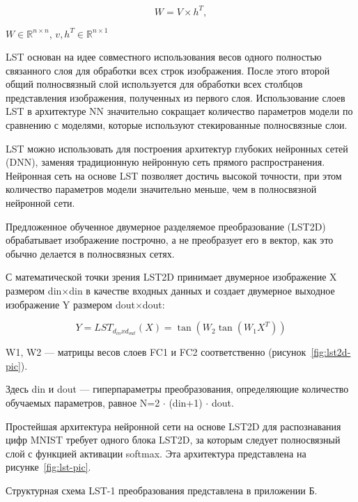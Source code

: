 \begin{equation}
    W = V \times h^T,
\end{equation}

 \(W\in \mathbb{R}^{n\times n}\), \(v, h^T\in \mathbb{R}^{n\times 1}\)

LST основан на идее совместного использования весов одного полностью связанного 
слоя для обработки всех строк изображения. После этого второй общий 
полносвязный слой используется для обработки всех столбцов представления 
изображения, полученных из первого слоя. Использование слоев LST в архитектуре 
NN значительно сокращает количество параметров модели по сравнению с моделями, 
которые используют стекированные полносвязные слои.

LST можно использовать для построения архитектур глубоких нейронных сетей 
(DNN), заменяя традиционную нейронную сеть прямого распространения. Нейронная 
сеть на основе LST позволяет достичь высокой точности, при этом количество 
параметров модели значительно меньше, чем в полносвязной нейронной сети.

Предложенное обученное двумерное разделяемое преобразование (LST2D) 
обрабатывает изображение построчно, а не преобразует его в вектор, как это 
обычно делается в полносвязных сетях. 

С математической точки зрения LST2D принимает двумерное изображение X размером 
din\(\times\)din в качестве входных данных и создает двумерное выходное 
изображение Y размером dout\(\times\)dout:

\begin{equation}
  Y = LST_{d_{in}xd_{out}}(X) = \tan(W_2\tan(W_1X^T))
\end{equation}

 W1, W2 — матрицы весов слоев FC1 и FC2 соответственно 
(рисунок~\ref{fig:lst2d-pic})\cite{LST2D}. 


Здесь din и dout — гиперпараметры преобразования, определяющие количество 
обучаемых параметров, равное N=2 $\cdot$ (din+1) $\cdot$ dout. 

Простейшая архитектура нейронной сети на основе LST2D для распознавания цифр 
MNIST требует одного блока LST2D, за которым следует полносвязный слой с 
функцией активации softmax. Эта архитектура представлена на 
рисунке~\ref{fig:lst-pic}\cite{LST2D}. 

Структурная схема LST-1 преобразования представлена в приложении Б.

